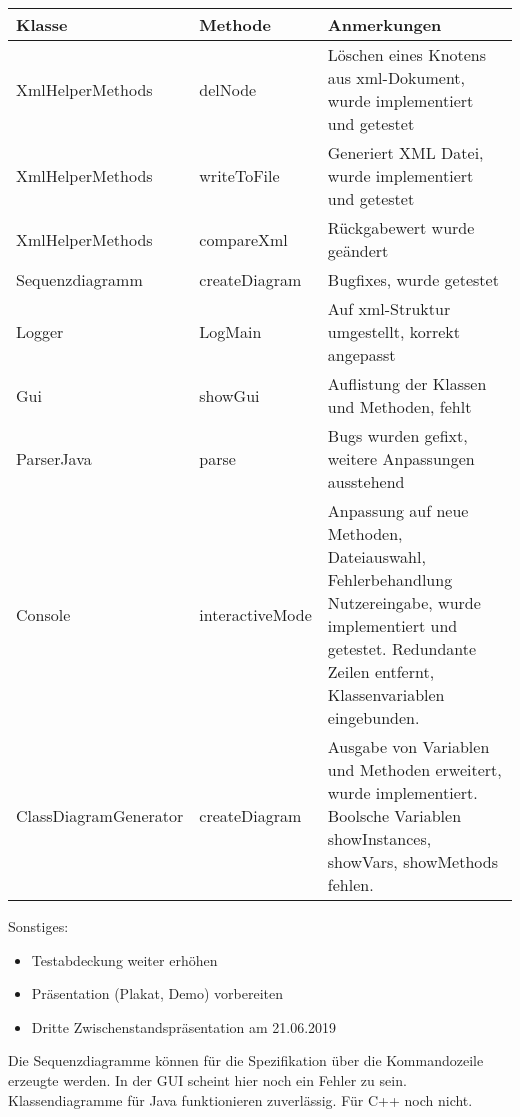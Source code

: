 \begin{table}[H]

\begin{tabularx}{\textwidth}{ |l|l|X| }
\hline
\textbf{Klasse} & \textbf{Methode} & \textbf{Anmerkungen}\\
 \hline
XmlHelperMethods & delNode & Löschen eines Knotens aus xml-Dokument, wurde implementiert und getestet\\ \hline
XmlHelperMethods & writeToFile & Generiert XML Datei, wurde implementiert und getestet\\ \hline
XmlHelperMethods & compareXml & Rückgabewert wurde geändert \\ \hline
Sequenzdiagramm & createDiagram & Bugfixes, wurde getestet\\\hline
Logger & LogMain & Auf xml-Struktur umgestellt, korrekt angepasst\\\hline
Gui & showGui & Auflistung der Klassen und Methoden, fehlt\\\hline
ParserJava & parse & Bugs wurden gefixt, weitere Anpassungen ausstehend \\ \hline
Console & interactiveMode & Anpassung auf neue Methoden, Dateiauswahl, Fehlerbehandlung Nutzereingabe, wurde implementiert und getestet. Redundante Zeilen entfernt, Klassenvariablen eingebunden. \\ \hline
ClassDiagramGenerator & createDiagram & Ausgabe von Variablen und Methoden erweitert, wurde implementiert. Boolsche Variablen showInstances, showVars, showMethods fehlen.\\ \hline
\end{tabularx}
\end{table}

Sonstiges:
\begin{itemize}
\item Testabdeckung weiter erhöhen
\item Präsentation (Plakat, Demo) vorbereiten
\item Dritte Zwischenstandspräsentation am 21.06.2019
\end{itemize}
\nsecend%


\nsecend%

Die Sequenzdiagramme können für die Spezifikation über die Kommandozeile erzeugte werden. In der GUI scheint hier noch ein Fehler zu sein. Klassendiagramme für Java funktionieren zuverlässig. Für C++ noch nicht. 
\nsecend%

